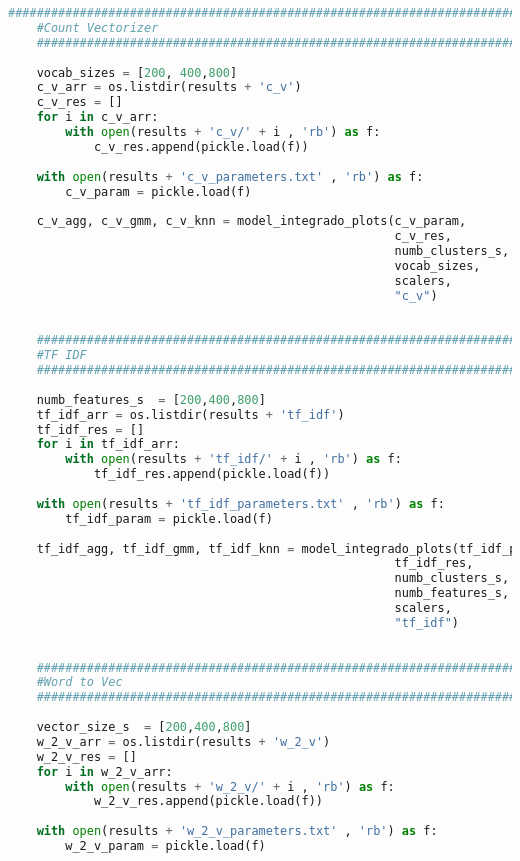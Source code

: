 \documentclass[12pt]{article}
\begin{document}
\begin{lstlisting}[language=Python, caption = Rutina de Visualización]
	#############################################################################
	#Count Vectorizer
	#############################################################################
	
	vocab_sizes = [200, 400,800]
	c_v_arr = os.listdir(results + 'c_v')
	c_v_res = []
	for i in c_v_arr:
	    with open(results + 'c_v/' + i , 'rb') as f: 
	        c_v_res.append(pickle.load(f))
	
	with open(results + 'c_v_parameters.txt' , 'rb') as f:
	    c_v_param = pickle.load(f)
	
	c_v_agg, c_v_gmm, c_v_knn = model_integrado_plots(c_v_param, 
	                                                  c_v_res, 
	                                                  numb_clusters_s, 
	                                                  vocab_sizes, 
	                                                  scalers, 
	                                                  "c_v")
	
	    
	#############################################################################
	#TF IDF
	#############################################################################
	
	numb_features_s  = [200,400,800]
	tf_idf_arr = os.listdir(results + 'tf_idf')
	tf_idf_res = []
	for i in tf_idf_arr:
	    with open(results + 'tf_idf/' + i , 'rb') as f: 
	        tf_idf_res.append(pickle.load(f))
	
	with open(results + 'tf_idf_parameters.txt' , 'rb') as f:
	    tf_idf_param = pickle.load(f)
	
	tf_idf_agg, tf_idf_gmm, tf_idf_knn = model_integrado_plots(tf_idf_param, 
	                                                  tf_idf_res, 
	                                                  numb_clusters_s, 
	                                                  numb_features_s, 
	                                                  scalers, 
	                                                  "tf_idf")
	
	
	#############################################################################
	#Word to Vec
	#############################################################################
	
	vector_size_s  = [200,400,800]
	w_2_v_arr = os.listdir(results + 'w_2_v')
	w_2_v_res = []
	for i in w_2_v_arr:
	    with open(results + 'w_2_v/' + i , 'rb') as f: 
	        w_2_v_res.append(pickle.load(f))
	
	with open(results + 'w_2_v_parameters.txt' , 'rb') as f:
	    w_2_v_param = pickle.load(f)
	

\end{lstlisting}
\end{document}
